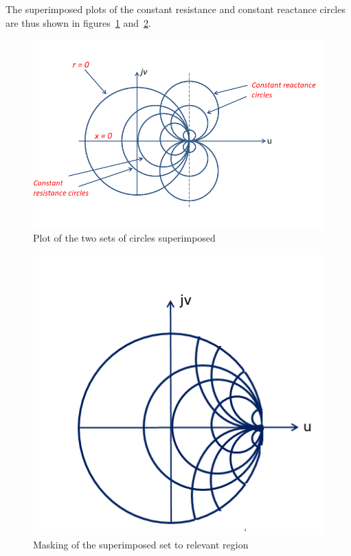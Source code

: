 The superimposed plots of the constant resistance and constant reactance circles are thus shown in figures~\ref{fig:ijnbvcxw} and~\ref{fig:sddfghj}.
\begin{figure}[h]
\centering
\includegraphics[width=1.1\linewidth]{graphics/const_resistance_reactance_circles}
\caption{Plot of the two sets of circles superimposed}
\label{fig:ijnbvcxw}
\end{figure}
\begin{figure}[h]
\centering
\includegraphics[width=0.8\linewidth]{graphics/relevant_region_SC}
\caption{Masking of the superimposed set to relevant region}
\label{fig:sddfghj}
\end{figure}

